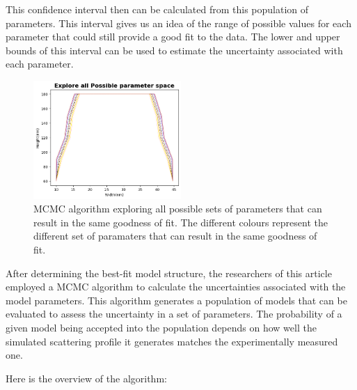 \medskip

This confidence interval then can be calculated from this population of parameters. This interval gives us an idea of the range of possible values for each parameter that could still provide a good fit to the data.
The lower and upper bounds of this interval can be used to estimate the uncertainty associated with each parameter.

\begin{figure}[h]
    \centering
    \includegraphics[width=0.5\textwidth]{images/mcmc.png}
    \caption{MCMC algorithm exploring all possible sets of parameters that can result in the same goodness of fit. The different
    colours represent the different set of paramaters that can result in the same goodness of fit.}
\end{figure}
\medskip



After determining the best-fit model structure, the researchers of this article \cite{sunday2016evaluation}
employed a MCMC algorithm to calculate the uncertainties associated with the model parameters.
This algorithm generates a population of models that can be evaluated to assess the uncertainty
in a set of parameters. The probability of a given model being accepted into the population
depends on how well the simulated scattering profile it generates matches the experimentally
measured one.

Here is the overview of the algorithm:

